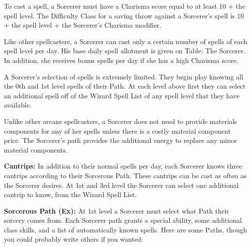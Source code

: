 To cast a spell, a Sorcerer must have a Charisma score equal to at least 10 + the spell level. The Difficulty Class for a saving throw against a Sorcerer's spell is 10 + the spell level + the Sorcerer's Charisma modifier.

Like other spellcasters, a Sorcerer can cast only a certain number of spells of each spell level per day. His base daily spell allotment is given on Table: The Sorcerer. In addition, she receives bonus spells per day if she has a high Charisma score.

A Sorcerer's selection of spells is extremely limited. They begin play knowing all the 0th and 1st level spells of their Path. At each level above first they can select an additional spell off of the Wizard Spell List of any spell level that they have available.

Unlike other arcane spellcasters, a Sorcerer does not need to provide materials components for any of her spells unless there is a costly material component price. The Sorcerer's path provides the additional energy to replace any minor material components.

\textbf{Cantrips:} In addition to their normal spells per day, each Sorcerer knows three cantrips according to their Sorcerous Path. These cantrips can be cast as often as the Sorcerer desires. At 1st and 3rd level the Sorcerer can select one additional cantrip to know, from the Wizard Spell List.

\textbf{Sorcerous Path (Ex):} At 1st level a Sorcerer must select what Path their sorcery comes from. Each Sorcerer path grants a special ability, some additional class skills, and a list of automatically known spells. Here are some Paths, though you could probably write others if you wanted:

